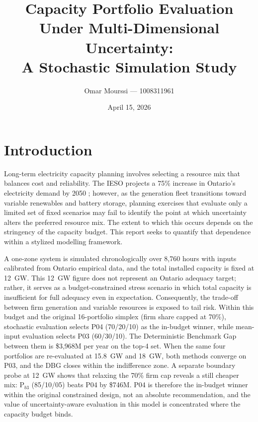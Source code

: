 \documentclass[11pt]{article}
\title{Capacity Portfolio Evaluation Under Multi-Dimensional Uncertainty:\\A Stochastic Simulation Study}
\author{Omar Mourssi --- 1008311961}
\date{April 15, 2026}
\begin{document}
\maketitle

\section{Introduction}\label{sec:intro}

Long-term electricity capacity planning involves selecting a resource mix that balances cost and reliability. The IESO projects a 75\% increase in Ontario's electricity demand by 2050 \citep{IESO2025}; however, as the generation fleet transitions toward variable renewables and battery storage, planning exercises that evaluate only a limited set of fixed scenarios may fail to identify the point at which uncertainty alters the preferred resource mix. The extent to which this occurs depends on the stringency of the capacity budget. This report seeks to quantify that dependence within a stylized modelling framework.

A one-zone system is simulated chronologically over 8{,}760 hours with inputs calibrated from Ontario empirical data, and the total installed capacity is fixed at 12~GW. This 12~GW figure does not represent an Ontario adequacy target; rather, it serves as a budget-constrained stress scenario in which total capacity is insufficient for full adequacy even in expectation. Consequently, the trade-off between firm generation and variable resources is exposed to tail risk. Within this budget and the original 16-portfolio simplex (firm share capped at 70\%), stochastic evaluation selects P04 (70/20/10) as the in-budget winner, while mean-input evaluation selects P03 (60/30/10). The Deterministic Benchmark Gap between them is \$3{,}968M per year on the top-4 set. When the same four portfolios are re-evaluated at 15.8~GW and 18~GW, both methods converge on P03, and the DBG closes within the indifference zone. A separate boundary probe at 12~GW shows that relaxing the 70\% firm cap reveals a still cheaper mix: P$_{b3}$ (85/10/05) beats P04 by \$746M. P04 is therefore the in-budget winner within the original constrained design, not an absolute recommendation, and the value of uncertainty-aware evaluation in this model is concentrated where the capacity budget binds.
\end{document}
